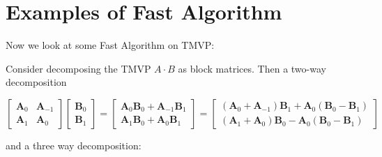 \documentclass[
11pt,notheorems,hyperref={pdfauthor=whatever}
]{beamer}
\begin{document}
\section{Examples of Fast Algorithm}
\begin{frame}
    Now we look at some Fast Algorithm on TMVP:

    Consider decomposing the TMVP $A\cdot B$ as block matrices. Then a two-way decomposition

    \[
\begin{bmatrix}
    \mathbf A_{0} & \mathbf A_{-1}\\
    \mathbf A_{1} & \mathbf A_{0}
\end{bmatrix}
\begin{bmatrix}
    \mathbf B_{0} \\ \mathbf B_{1}
\end{bmatrix}
=
\begin{bmatrix}
    \mathbf A_{0} \mathbf B_{0} + \mathbf A_{-1} \mathbf B_{1} \\
    \mathbf A_{1} \mathbf B_{0} + \mathbf A_{0} \mathbf B_{1} 
\end{bmatrix}
=
\begin{bmatrix}
    (\mathbf A_{0} + \mathbf A_{-1}) \mathbf B_{1} + \mathbf A_{0} (\mathbf B_{0} - \mathbf B_{1})
    \\ 
    (\mathbf A_{1} + \mathbf A_{0}) \mathbf B_{0} - \mathbf A_{0} (\mathbf B_{0} - \mathbf B_{1})
\end{bmatrix}
    \]

    and a three way decomposition:


\end{frame}
\end{document}
